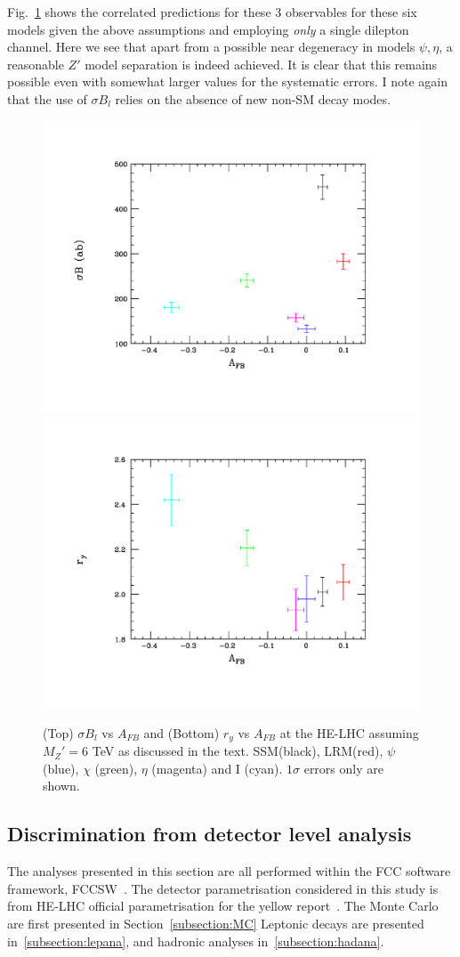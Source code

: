 Fig.~\ref{toy3} shows the correlated predictions for these 3 observables for these six models given the above assumptions and employing {\it only} a single dilepton 
channel. Here we see that apart from a possible near degeneracy in models $\psi,\eta$, a reasonable $Z'$ model separation is indeed achieved. It is clear that this 
remains possible even with somewhat larger values for the systematic errors. I note again that the use of $\sigma B_l$ relies on the absence of new non-SM decay 
modes.



\begin{figure}[htbp]
  \centering
\includegraphics[trim={2cm 2cm 2cm 2cm},clip,width=0.49\columnwidth]{Fig/compare2-n.pdf}
\includegraphics[trim={2cm 2cm 2cm 2cm},clip,width=0.49\columnwidth]{Fig/compare3-n.pdf}
\caption{(Top) $\sigma B_l$ vs $A_{FB}$ and (Bottom) $r_y$ vs $A_{FB}$ at the HE-LHC assuming $M_Z'=6$ TeV as discussed in the text. 
SSM(black), LRM(red), $\psi$ (blue), $\chi$ (green), $\eta$ (magenta) and I (cyan). $1\sigma$ errors only are shown. }
\label{toy3}
\end{figure}




\subsection{Discrimination from detector level analysis}
The analyses presented in this section are all performed within the FCC software framework, FCCSW~\cite{fccsw_web}.
The detector parametrisation considered in this study is from HE-LHC official parametrisation for the yellow report~\cite{hlhelhc_web}.
The Monte Carlo are first presented in Section~\ref{subsection:MC} Leptonic decays are presented in~\ref{subsection:lepana}, and hadronic analyses in~\ref{subsection:hadana}.



